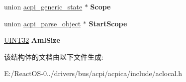 \begin{DoxyCompactItemize}
\item 
\mbox{\label{structacpi__parse__state_a464d6ba1a646f6ad328fe9c3b85d9ba9}} 
union \hyperlink{unionacpi__generic__state}{acpi\+\_\+generic\+\_\+state} $\ast$ {\bfseries Scope}
\item 
\mbox{\label{structacpi__parse__state_adaf72ccea191db66a5ceed756f7fccb9}} 
union \hyperlink{unionacpi__parse__object}{acpi\+\_\+parse\+\_\+object} $\ast$ {\bfseries Start\+Scope}
\item 
\mbox{\label{structacpi__parse__state_a666cc732623e1aba8217a40869a88d5b}} 
\hyperlink{_processor_bind_8h_ae1e6edbbc26d6fbc71a90190d0266018}{U\+I\+N\+T32} {\bfseries Aml\+Size}
\end{DoxyCompactItemize}


该结构体的文档由以下文件生成\+:\begin{DoxyCompactItemize}
\item 
E\+:/\+React\+O\+S-\/0../drivers/bus/acpi/acpica/include/aclocal.\+h\end{DoxyCompactItemize}
